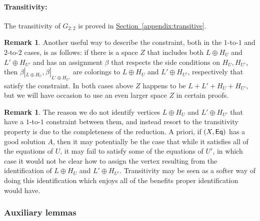 \documentclass[11pt]{article}
\numberwithin{equation}{section}
\theoremstyle{definition}
\newtheorem{remark}[theorem]{Remark}
\theoremstyle{plain}
\newcommand{\expref}[2]{\hyperref[#2]{#1~\ref{#2}}}
\newcommand*\xor{\mathbin{\oplus}}
\begin{document}
\paragraph{Transitivity:} The transitivity of $G_{2:2}$ is proved in \expref{Section}{appendix:transitive}.

\begin{remark}\label{remark:useful_222}
Another useful way to describe the constraint, both in the $1$-to-$1$ and $2$-to-$2$
%
cases,  %
is as follows: if there is a space $Z$ that includes both
$L\xor H_U$ and $L' \xor H_{U'}$ and has an assignment $\beta$ that respects the side conditions on $H_{U}, H_{U'}$, then
$\beta|_{L\xor H_U}, \beta|_{L' \xor H_{U'}}$ are colorings to $L\xor H_U$ and  $L'\xor H_{U'}$, respectively that satisfy the constraint.  %
In both cases above $Z$ happens to be $L+ L' + H_U + H_{U'}$, but we will have occasion to use an even larger space $Z$ in certain proofs.
\end{remark}

\begin{remark}\label{remark:transitivity_why}
  The reason we do not identify vertices $L\oplus H_U$ and $L'\oplus H_{U'}$ that have a
  $1$-to-$1$ constraint between them, and instead resort to the transitivity property is due
  to the completeness of the reduction. A priori, if $(X,{\sf Eq})$ has a good solution $A$,
  then it may potentially be the case that while it satisfies all of the equations of $U$,
  it may fail to satisfy some of the equations of $U'$, in which case it would not be clear
  how to assign the vertex resulting from the identification of $L\oplus H_U$ and $L'\oplus H_{U'}$.
  Transitivity may be seen as a softer way of doing this identification which enjoys all of the benefits
  proper identification would have.
\end{remark}


%
\subsubsection{Auxiliary lemmas}
\end{document}
